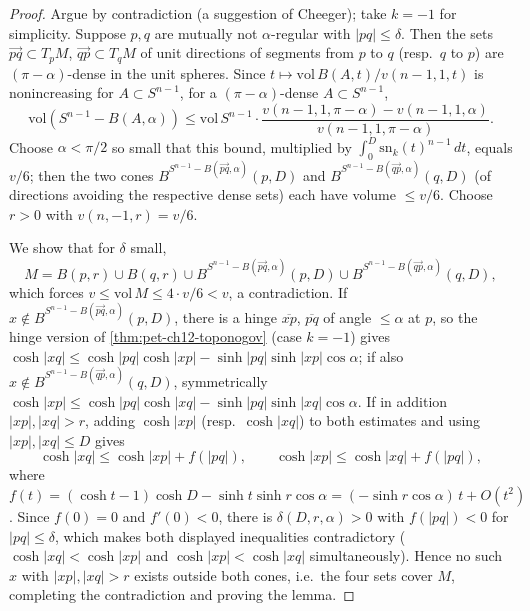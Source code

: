 \begin{proof}
  Argue by contradiction (a suggestion of Cheeger); take $k=-1$ for simplicity.
  Suppose $p,q$ are mutually not $\alpha$-regular with $|pq|\le\delta$. Then the
  sets $\overrightarrow{pq}\subset T_pM$, $\overrightarrow{qp}\subset T_qM$ of
  unit directions of segments from $p$ to $q$ (resp.\ $q$ to $p$) are
  $(\pi-\alpha)$-dense in the unit spheres. Since $t\mapsto\mathrm{vol}\,B(A,t)/v(n-1,1,t)$
  is nonincreasing for $A\subset S^{n-1}$, for a $(\pi-\alpha)$-dense
  $A\subset S^{n-1}$,
  \[
    \mathrm{vol}(S^{n-1}-B(A,\alpha))\le\mathrm{vol}\,S^{n-1}\cdot
    \frac{v(n-1,1,\pi-\alpha)-v(n-1,1,\alpha)}{v(n-1,1,\pi-\alpha)}.
  \]
  Choose $\alpha<\pi/2$ so small that this bound, multiplied by
  $\int_0^D\mathrm{sn}_k(t)^{n-1}\,dt$, equals $v/6$; then the two cones
  $B^{S^{n-1}-B(\overrightarrow{pq},\alpha)}(p,D)$ and
  $B^{S^{n-1}-B(\overrightarrow{qp},\alpha)}(q,D)$ (of directions avoiding the
  respective dense sets) each have volume $\le v/6$. Choose $r>0$ with
  $v(n,-1,r)=v/6$.

  We show that for $\delta$ small,
  \[
    M=B(p,r)\cup B(q,r)\cup B^{S^{n-1}-B(\overrightarrow{pq},\alpha)}(p,D)
    \cup B^{S^{n-1}-B(\overrightarrow{qp},\alpha)}(q,D),
  \]
  which forces $v\le\mathrm{vol}\,M\le4\cdot v/6<v$, a contradiction. If
  $x\notin B^{S^{n-1}-B(\overrightarrow{pq},\alpha)}(p,D)$, there is a hinge
  $\overline{xp}$, $\overline{pq}$ of angle $\le\alpha$ at $p$, so the hinge
  version of \cref{thm:pet-ch12-toponogov} (case $k=-1$) gives
  $\cosh|xq|\le\cosh|pq|\cosh|xp|-\sinh|pq|\sinh|xp|\cos\alpha$; if also
  $x\notin B^{S^{n-1}-B(\overrightarrow{qp},\alpha)}(q,D)$, symmetrically
  $\cosh|xp|\le\cosh|pq|\cosh|xq|-\sinh|pq|\sinh|xq|\cos\alpha$. If in addition
  $|xp|,|xq|>r$, adding $\cosh|xp|$ (resp.\ $\cosh|xq|$) to both estimates and
  using $|xp|,|xq|\le D$ gives
  \[
    \cosh|xq|\le\cosh|xp|+f(|pq|),\qquad\cosh|xp|\le\cosh|xq|+f(|pq|),
  \]
  where $f(t)=(\cosh t-1)\cosh D-\sinh t\sinh r\cos\alpha=(-\sinh
  r\cos\alpha)\,t+O(t^2)$. Since $f(0)=0$ and $f'(0)<0$, there is
  $\delta(D,r,\alpha)>0$ with $f(|pq|)<0$ for $|pq|\le\delta$, which makes both
  displayed inequalities contradictory ($\cosh|xq|<\cosh|xp|$ and
  $\cosh|xp|<\cosh|xq|$ simultaneously). Hence no such $x$ with $|xp|,|xq|>r$
  exists outside both cones, i.e.\ the four sets cover $M$, completing the
  contradiction and proving the lemma.
\end{proof}

